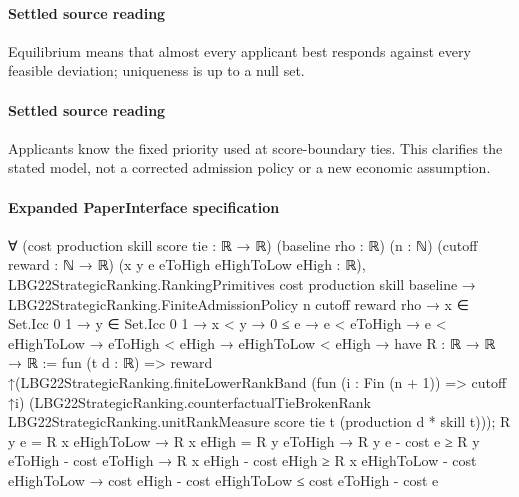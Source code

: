 \documentclass[10pt]{article}
\begin{document}
\paragraph{Settled source reading}
\begin{sloppypar}
Equilibrium means that almost every applicant best responds against every feasible deviation;\allowbreak{} uniqueness is up to a null set.\allowbreak{}
\end{sloppypar}
\paragraph{Settled source reading}
\begin{sloppypar}
Applicants know the fixed priority used at score-\allowbreak{}boundary ties.\allowbreak{} This clarifies the stated model, not a corrected admission policy or a new economic assumption.\allowbreak{}
\end{sloppypar}

\paragraph{Expanded PaperInterface specification}
\begin{ReviewVerbatim}
∀ (cost production skill score tie : ℝ → ℝ) (baseline rho : ℝ) (n : ℕ) (cutoff reward : ℕ → ℝ)
  (x y e eToHigh eHighToLow eHigh : ℝ),
  LBG22StrategicRanking.RankingPrimitives cost production skill baseline →
    LBG22StrategicRanking.FiniteAdmissionPolicy n cutoff reward rho →
      x ∈ Set.Icc 0 1 →
        y ∈ Set.Icc 0 1 →
          x < y →
            0 ≤ e →
              e < eToHigh →
                e < eHighToLow →
                  eToHigh < eHigh →
                    eHighToLow < eHigh →
                      have R : ℝ → ℝ → ℝ := fun (t d : ℝ) =>
                        reward
                          ↑(LBG22StrategicRanking.finiteLowerRankBand (fun (i : Fin (n + 1)) => cutoff ↑i)
                              (LBG22StrategicRanking.counterfactualTieBrokenRank LBG22StrategicRanking.unitRankMeasure
                                score tie t (production d * skill t)));
                      R y e = R x eHighToLow →
                        R x eHigh = R y eToHigh →
                          R y e - cost e ≥ R y eToHigh - cost eToHigh →
                            R x eHigh - cost eHigh ≥ R x eHighToLow - cost eHighToLow →
                              cost eHigh - cost eHighToLow ≤ cost eToHigh - cost e
\end{ReviewVerbatim}
\end{document}
